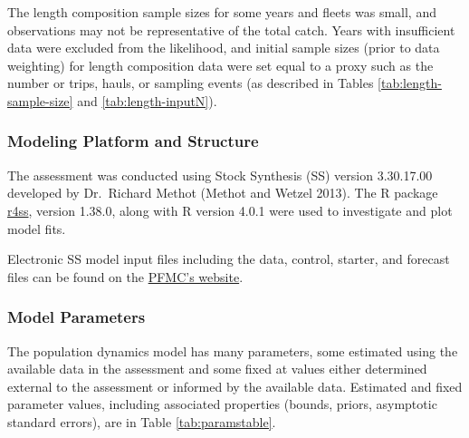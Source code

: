 \documentclass[
  english,
  a4paper,
]{article}
\begin{document}
The length composition sample sizes for some years and fleets was small, and observations may not be
representative of the total catch. Years with insufficient data were excluded from the likelihood, and initial sample sizes (prior to data weighting) for length composition data were set equal to a proxy such as the number or trips, hauls, or sampling events (as described in Tables \ref{tab:length-sample-size} and \ref{tab:length-inputN}).

\hypertarget{modeling-platform-and-structure}{%
\subsubsection{Modeling Platform and Structure}\label{modeling-platform-and-structure}}

The assessment was conducted using Stock Synthesis (SS) version 3.30.17.00 developed by
Dr.~Richard Methot (Methot and Wetzel 2013). The R package \href{https://github.com/r4ss/r4ss}{r4ss}, version
1.38.0, along with R version 4.0.1 were used to investigate and plot model fits.

Electronic SS model input files including the data, control, starter, and forecast files can be
found on the
\href{https://www.pcouncil.org/groundfish/stock-assessments/}{PFMC's website}.

\hypertarget{model-parameters}{%
\subsubsection{Model Parameters}\label{model-parameters}}

The population dynamics model has many parameters, some estimated using the available data in the assessment and some fixed at values either determined external to the assessment or informed by the available data. Estimated and fixed parameter values, including associated properties (bounds, priors, asymptotic standard errors), are in Table \ref{tab:paramstable}.
\end{document}
